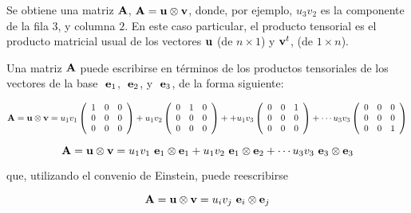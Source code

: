 \bigskip


Se obtiene una matriz $\bold{A}$, $\bold{A}= \bold{u} \otimes \bold{v} $, donde, por ejemplo, $ u_3 v_2 $ es la  componente de la fila  $3$, y columna $2$. En este caso particular, el producto tensorial es el producto   matricial usual  de los vectores $ \bold{u}$ (de $n \times 1$)  y  $\bold{v}^t$, (de $1 \times n$). 


Una matriz $\bold{A}$ puede escribirse en términos de los productos tensoriales de los vectores de la base $~\bold{e}_1$, $~\bold{e}_2$, y $~\bold{e}_3  $, de la forma siguiente:

\bigskip

\begin{equation}
\bold{A}= \bold{u} \otimes \bold{v}=
u_1 v_1 \left( \begin{array}{ccc} 1  & 0   & 0 \\ 0    & 0 & 0
\\  0 & 0 & 0
\end{array}
 \right)+  u_1 v_2 \left( \begin{array}{ccc} 0  & 1   & 0 \\ 0    & 0 & 0
\\  0 & 0 & 0
\end{array}
 \right)+ 
 
+ u_1 v_3 \left( \begin{array}{ccc} 0  & 0   & 1 \\ 0    & 0 & 0
\\  0 & 0 & 0
\end{array}
 \right)+ \cdots u_3 v_3 \left( \begin{array}{ccc} 0  & 0   & 0 \\ 0    & 0 & 0
\\  0 & 0 & 1
\end{array}
 \right)
\end{equation}




\begin{equation}
\bold{A}= \bold{u} \otimes \bold{v}= u_1v_1 ~ \bold{e}_1 \otimes \bold{e}_1 + u_1v_2  ~\bold{e}_1 \otimes \bold{e}_2 +  \cdots  u_3v_3  ~\bold{e}_3 \otimes \bold{e}_3
\end{equation}

\bigskip

\noindent
que, utilizando el convenio de Einstein, puede  reescribirse
 

\begin{equation}
\bold{A}= \bold{u} \otimes \bold{v}= u_iv_j ~\bold{e}_i \otimes \bold{e}_j 
\end{equation}


